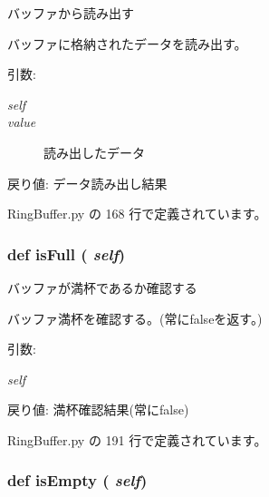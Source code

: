 バッファから読み出す 

バッファに格納されたデータを読み出す。

\begin{Desc}
\item[引数:]
\begin{description}
\item[{\em self}]\item[{\em value}]読み出したデータ\end{description}
\end{Desc}
\begin{Desc}
\item[戻り値:]データ読み出し結果 \end{Desc}


 RingBuffer.py の 168 行で定義されています。
\subsubsection{\setlength{\rightskip}{0pt plus 5cm}def isFull ( {\em self})}\label{classsource__py_1_1_ring_buffer_1_1_ring_buffer_4928b8e993df1ab082183bda426cb9b1}


バッファが満杯であるか確認する 

バッファ満杯を確認する。(常にfalseを返す。)

\begin{Desc}
\item[引数:]
\begin{description}
\item[{\em self}]\end{description}
\end{Desc}
\begin{Desc}
\item[戻り値:]満杯確認結果(常にfalse) \end{Desc}


 RingBuffer.py の 191 行で定義されています。
\subsubsection{\setlength{\rightskip}{0pt plus 5cm}def isEmpty ( {\em self})}\label{classsource__py_1_1_ring_buffer_1_1_ring_buffer_fb7514ca88d7e70499debb1302c4497d}


